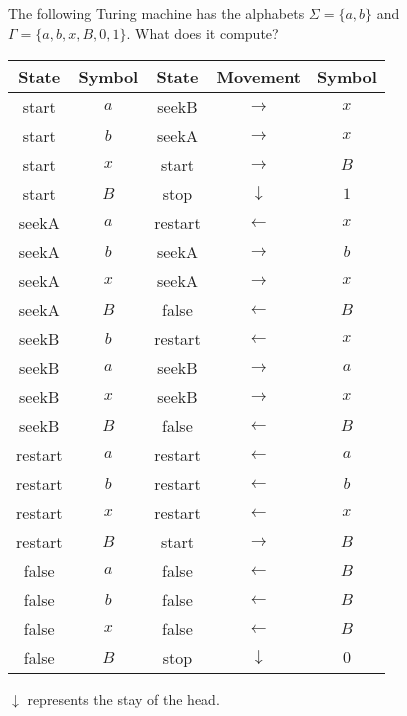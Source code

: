 \subsection{} %
The following Turing machine has the alphabets \(\Sigma = \{a, b\}\)
and \(\Gamma = \{a, b, x, B, 0, 1\}\).
What does it compute?

\begin{center}
\begin{tabular}{|c|c||c|c|c|}
	\hline
	\textbf{State} & \textbf{Symbol} & \textbf{State} & \textbf{Movement} & \textbf{Symbol} \\
	\hline
	start & $a$ & seekB & $\to$ & $x$ \\
	\hline
	start & $b$ & seekA & $\to$ & $x$ \\
	\hline
	start & $x$ & start & $\to$ & $B$ \\
	\hline
	start & $B$ & stop & $\downarrow$ & $1$ \\
	\hline
	seekA & $a$ & restart & $\leftarrow$ & $x$ \\
	\hline
	seekA & $b$ & seekA & $\to$ & $b$ \\
	\hline
	seekA & $x$ & seekA & $\to$ & $x$ \\
	\hline
	seekA & $B$ & false & $\leftarrow$ & $B$ \\
	\hline
	seekB & $b$ & restart & $\leftarrow$ & $x$ \\
	\hline
	seekB & $a$ & seekB & $\to$ & $a$ \\
	\hline
	seekB & $x$ & seekB & $\to$ & $x$ \\
	\hline
	seekB & $B$ & false & $\leftarrow$ & $B$ \\
	\hline
	restart & $a$ & restart & $\leftarrow$ & $a$ \\
	\hline
	restart & $b$ & restart & $\leftarrow$ & $b$ \\
	\hline
	restart & $x$ & restart & $\leftarrow$ & $x$ \\
	\hline
	restart & $B$ & start & $\to$ & $B$ \\
	\hline
	false & $a$ & false & $\leftarrow$ & $B$ \\
	\hline
	false & $b$ & false & $\leftarrow$ & $B$ \\
	\hline
	false & $x$ & false & $\leftarrow$ & $B$ \\
	\hline
	false & $B$ & stop & $\downarrow$ & $0$ \\
	\hline
\end{tabular}
\end{center}
\noindent \(\downarrow\) represents the stay of the head.
\bigskip

